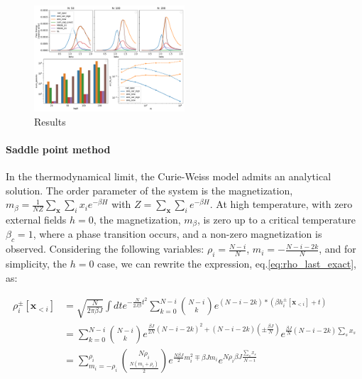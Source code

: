 \documentclass[aps,physrev,10pt,floatfix,longbibliography,nofootinbib,reprint]{revtex4-2}
\begin{document}
\begin{figure}[!h]
    \centering
    \includegraphics[width=0.5\textwidth]{img/CW_res.pdf}
    \caption{Results}
    \label{fig:curie_weiss}
\end{figure}


\paragraph{Saddle point method}
In the thermodynamical limit, the Curie-Weiss model admits an analytical solution. The order parameter of the system is the magnetization, $m_{\beta}=\frac{1}{N Z}\sum_{\mathbf{x}}\sum_i x_i e^{-\beta H}$ with $Z = \sum_{\mathbf{x}}\sum_i e^{-\beta H}$. At high temperature, with zero external fields $h=0$, the magnetization, $m_{\beta}$, is zero up to a critical temperature $\beta_c=1$, where a phase transition occurs, and a non-zero magnetization is observed. Considering the following variables: $\rho_i = \frac{N-i}{N}$, $m_i = -\frac{N-i-2k}{N}$, and for simplicity, the $h=0$ case, we can rewrite the expression, eq.\ref{eq:rho_last_exact}, as:
\begin{widetext}
    \begin{align*}
    \rho_i^{\pm}[\mathbf{x}_{<i}] &= \sqrt{\frac{N}{2\pi \beta J}}\int dt e^{-\frac{N}{2J \beta}t^{2}} 
    \sum_{k=0}^{N-i} \binom{N-i}{k} e^{(N-i-2k)*(\beta h_i^{\pm}[\mathbf{x}_{<i}] + t)}\\
    &= \sum_{k=0}^{N-i} \binom{N-i}{k}e^{\frac{\beta J}{2N}\left(N-i-2k\right)^{2}+\left(N-i-2k\right)\left(\pm\frac{\beta J}{N}\right)} e^{\frac{\beta J}{N}\left(N-i-2k\right) \sum_s x_s} \\
    &= \sum_{m_i=-\rho_i}^{\rho_i} \binom{N\rho_i}{\frac{N(m_i+\rho_i)}{2}} e^{\frac{N \beta J}{2}m_i^{2} \mp \beta J m_i } e^{N \rho_i \beta J \frac{\sum_s x_s}{N-i}}
    \end{align*}    
\end{widetext}
\end{document}
